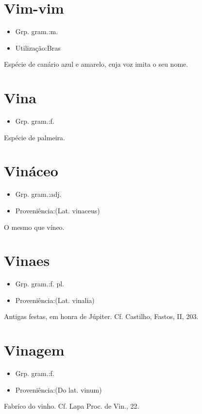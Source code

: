 \documentclass{article}
\begin{document}
\section{Vim-vim}
\begin{itemize}
\item {Grp. gram.:m.}
\end{itemize}
\begin{itemize}
\item {Utilização:Bras}
\end{itemize}
Espécie de canário azul e amarelo, cuja voz imita o seu nome.
\section{Vina}
\begin{itemize}
\item {Grp. gram.:f.}
\end{itemize}
Espécie de palmeira.
\section{Vináceo}
\begin{itemize}
\item {Grp. gram.:adj.}
\end{itemize}
\begin{itemize}
\item {Proveniência:(Lat. \textunderscore vinaceus\textunderscore )}
\end{itemize}
O mesmo que \textunderscore víneo\textunderscore .
\section{Vinaes}
\begin{itemize}
\item {Grp. gram.:f. pl.}
\end{itemize}
\begin{itemize}
\item {Proveniência:(Lat. \textunderscore vinalia\textunderscore )}
\end{itemize}
Antigas festas, em honra de Júpiter. Cf. Castilho, \textunderscore Fastos\textunderscore , II, 203.
\section{Vinagem}
\begin{itemize}
\item {Grp. gram.:f.}
\end{itemize}
\begin{itemize}
\item {Proveniência:(Do lat. \textunderscore vinum\textunderscore )}
\end{itemize}
Fabríco do vinho. Cf. Lapa \textunderscore Proc. de Vin.\textunderscore , 22.
\end{document}
